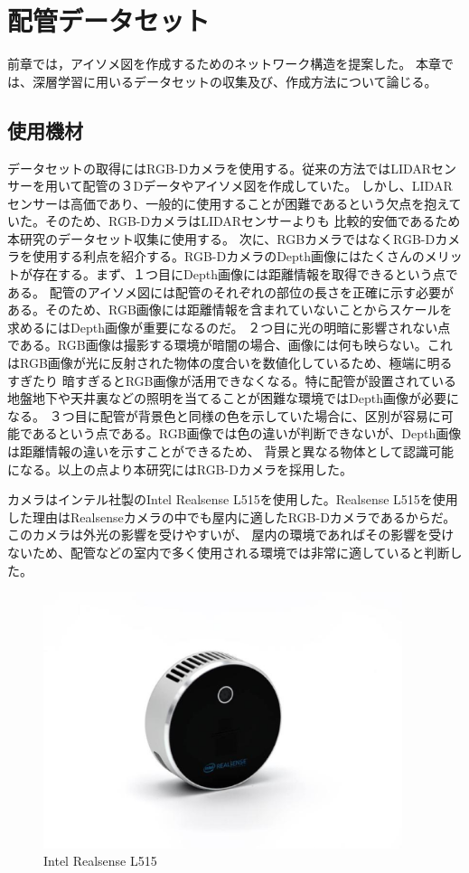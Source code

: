 \chapter{%
配管データセット}

前章では，アイソメ図を作成するためのネットワーク構造を提案した。
本章では、深層学習に用いるデータセットの収集及び、作成方法について論じる。


\section{使用機材}
データセットの取得にはRGB-Dカメラを使用する。従来の方法ではLIDARセンサーを用いて配管の３Dデータやアイソメ図を作成していた。
しかし、LIDARセンサーは高価であり、一般的に使用することが困難であるという欠点を抱えていた。そのため、RGB-DカメラはLIDARセンサーよりも
比較的安価であるため本研究のデータセット収集に使用する。
次に、RGBカメラではなくRGB-Dカメラを使用する利点を紹介する。RGB-DカメラのDepth画像にはたくさんのメリットが存在する。まず、１つ目にDepth画像には距離情報を取得できるという点である。
配管のアイソメ図には配管のそれぞれの部位の長さを正確に示す必要がある。そのため、RGB画像には距離情報を含まれていないことからスケールを求めるにはDepth画像が重要になるのだ。
２つ目に光の明暗に影響されない点である。RGB画像は撮影する環境が暗闇の場合、画像には何も映らない。これはRGB画像が光に反射された物体の度合いを数値化しているため、極端に明るすぎたり
暗すぎるとRGB画像が活用できなくなる。特に配管が設置されている地盤地下や天井裏などの照明を当てることが困難な環境ではDepth画像が必要になる。
３つ目に配管が背景色と同様の色を示していた場合に、区別が容易に可能であるという点である。RGB画像では色の違いが判断できないが、Depth画像は距離情報の違いを示すことができるため、
背景と異なる物体として認識可能になる。以上の点より本研究にはRGB-Dカメラを採用した。


カメラはインテル社製のIntel Realsense L515を使用した。Realsense L515を使用した理由はRealsenseカメラの中でも屋内に適したRGB-Dカメラであるからだ。このカメラは外光の影響を受けやすいが、
屋内の環境であればその影響を受けないため、配管などの室内で多く使用される環境では非常に適していると判断した。
\begin{figure}[htbt]
	\centering
	 \includegraphics[height=75mm]{realsense.eps}
	 \caption{Intel Realsense L515}
	 \label{fig:f2}
\end{figure}


